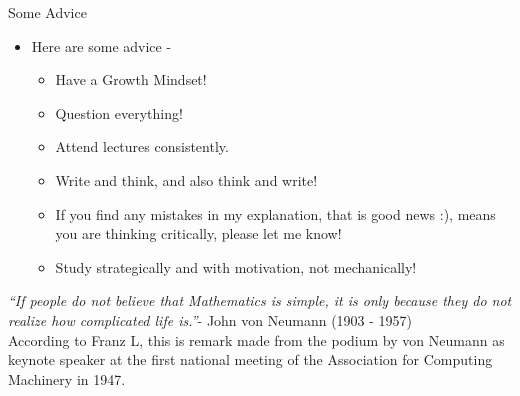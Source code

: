 \documentclass[8pt, usepdftitle=false]{beamer}
\begin{document}


\begin{frame}{Some Advice}
  
  \begin{itemize}
 \fontsize{8}{12}\selectfont \itshape

        \item Here are some advice -  
       \begin{itemize}
            \item Have a Growth Mindset!
            \item Question everything!
            \item Attend lectures consistently.
            \item Write and think, and also think and write!
            \item If you find any mistakes in my explanation, that is good news :), means you are thinking critically, please let me know!
            \item Study strategically and with motivation, not mechanically!

        \end{itemize}


  \end{itemize}

\end{frame}

\begin{frame}
  


\begin{center}
      \emph{``If people do not believe that Mathematics is simple, it is only because they do not realize how complicated life is.''}{{- John von Neumann (1903 - 1957)}}{\\
    \vspace*{.2cm}
    According to Franz L, this is rem{}ark made from the podium by von Neumann as keynote speaker at the first national meeting of the Association for Computing Machinery in 1947.}
\end{center}

    
      


\end{frame}
\end{document}
